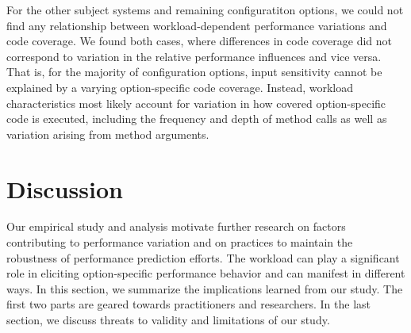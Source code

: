 For the other subject systems and remaining configuratiton options, we could not find any relationship between workload-dependent performance variations and code coverage. We found both cases, where differences in code coverage did not correspond to variation in the relative performance influences and vice versa. That is, for the majority of configuration options, input sensitivity cannot be explained by a varying option-specific code coverage. Instead, workload characteristics most likely account for variation in how covered option-specific code is executed, including the frequency and depth of method calls as well as variation arising from method arguments.
\vspace{2mm}

\section{Discussion}\label{sec:discussion}
Our empirical study and analysis motivate further research on factors contributing to performance variation and on practices to maintain the robustness of performance prediction efforts. The workload can play a significant role in eliciting option-specific performance behavior and can manifest in different ways. In this section, we summarize the implications learned from our study. The first two parts are geared towards practitioners and researchers. In the last section, we discuss threats to validity and limitations of our study.
